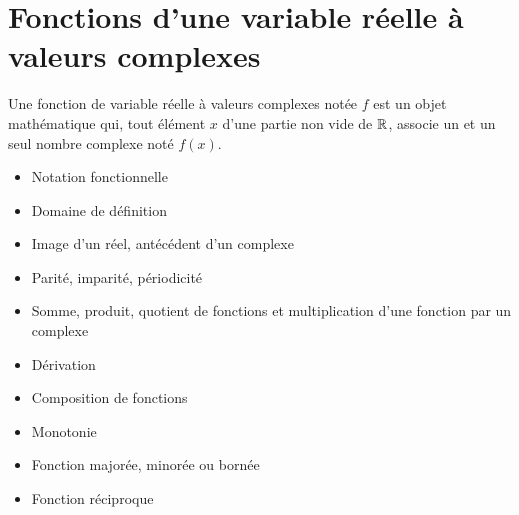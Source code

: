 \section{Fonctions d'une variable réelle à valeurs complexes}

\begin{defi}
	Une fonction de variable réelle à valeurs complexes notée \(f\) est un objet mathématique qui, tout élément \(x\) d’une partie non vide de \(\mathbb{R}\), associe un et un seul nombre complexe noté \(f (x)\).
\end{defi}

\begin{defprop}
	\begin{itemize}
		\item Notation fonctionnelle
		\item Domaine de définition
		\item Image d’un réel, antécédent d’un complexe
		\item Parité, imparité, périodicité
		\item Somme, produit, quotient de fonctions et multiplication d’une fonction par un complexe
		\item Dérivation
	\end{itemize}
\end{defprop}


\begin{defprop}
	\begin{itemize}
		\item Composition de fonctions
		\item Monotonie
		\item Fonction majorée, minorée ou bornée
		\item Fonction réciproque
	\end{itemize}
\end{defprop}

